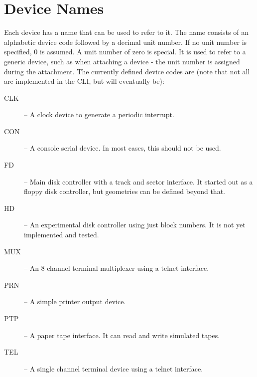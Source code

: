\documentclass[10pt, openany]{book}
\begin{document}
\section{Device Names}
Each device has a name that can be used to refer to it.  The name consists of an alphabetic device code followed by a decimal unit number.  If no unit number is specified, 0 is assumed.  A unit number of zero is special.  It is used to refer to a generic device, such as when attaching a device - the unit number is assigned during the attachment.
The currently defined device codes are (note that not all are implemented in the CLI, but will eventually be):
\begin{description}
  \item[CLK] -- A clock device to generate a periodic interrupt.
  \item[CON] -- A console serial device.  In most cases, this should not be used.
  \item[FD] -- Main disk controller with a track and sector interface.  It started out as a floppy disk controller, but geometries can be defined beyond that.
  \item[HD] -- An experimental disk controller using just block numbers.  It is not yet implemented and tested.
  \item[MUX] -- An 8 channel terminal multiplexer using a telnet interface.
  \item[PRN] -- A simple printer output device.
  \item[PTP] -- A paper tape interface.  It can read and write simulated tapes.
  \item[TEL] -- A single channel terminal device using a telnet interface.
\end{description}
\end{document}
